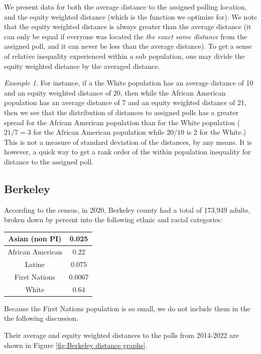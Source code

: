 \documentclass[11pt]{article}
\theoremstyle{remark}
\newtheorem{eg}[thm]{Example}
\theoremstyle{definition}
\begin{document}
We present data for both the average distance to the assigned polling location, and the equity weighted distance (which is the function we optimize for). We note that the equity weighted distance is always greater than the average distance (it can only be equal if everyone was located the \emph{the exact same distance} from the assigned poll, and it can never be less than the average distance). To get a sense of relative inequality experienced within a sub population, one may divide the equity weighted distance by the averaged distance. 
\begin{eg}
	For instance, if a the White population has an average distance of 10 and an equity weighted distance of 20, then while the African American population has an average distance of 7 and an equity weighted distance of 21, then we see that the distribution of distances to assigned polls has a greater spread for the African American population than for the White population ($21/7 = 3$ for the African American population while $20/10$ is 2 for the White.) This is not a measure of standard deviation of the distances, by any means. It is however, a quick way to get a rank order of the within population inequality for distance to the assigned poll.
\end{eg}

\subsection{Berkeley \label{sec:Berkeley distances}}
According to the census, in 2020, Berkeley county had a total of 173,949 adults, broken down by percent into the following ethnic and racial categories:

\begin{tabular} {| c | c |} 
	\hline
	Asian (non PI) &  0.025 \\ \hline
	African American & 0.22 \\ \hline
	Latine & 0.075 \\ \hline
	First Nations & 0.0067 \\ \hline
	White  & 0.64 \\ \hline
\end{tabular}

Because the First Nations population is so small, we do not include them in the the following discussion.

Their average and equity weighted distances to the polls from 2014-2022 are shown in Figure \ref{fig:Berkeley distance graphs}.
\end{document}
